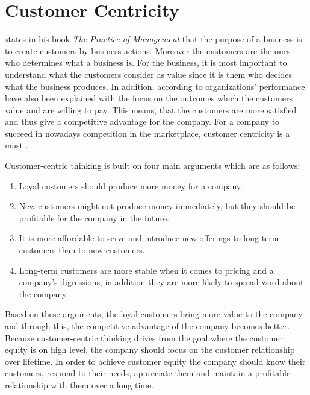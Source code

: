 \section{Customer Centricity}

\textcite{Drucker:2007} states in his book \emph{The Practice of Management} that the purpose of a business is to create customers by business actions. Moreover the customers are the ones who determines what a business is. For the business, it is most important to understand what the customers consider as value since it is them who decides what the business produces. In addition, according to \textcite{Parniangtong:2017} organizations' performance have also been explained with the focus on the outcomes which the customers value and are willing to pay. This means, that the customers are more satisfied and thus give a competitive advantage for the company. For a company to succeed in nowadays competition in the marketplace, customer centricity is a must \parencite{PathToCustomerCentricity:2006}.

Customer-centric thinking is built on four main arguments which are as follows:
\begin{enumerate}
\item Loyal customers should produce more money for a company.
\item New customers might not produce money immediately, but they should be profitable for the company in the future.
\item  It is more affordable to serve and introduce new offerings to long-term customers than to new customers.
\item  Long-term customers are more stable when it comes to pricing and a company's digressions, in addition they are more likely to spread word about the company. \parencite{Parniangtong:2017}
\end{enumerate}

Based on these arguments, the loyal customers bring more value to the company and through this, the competitive advantage of the company becomes better. Because customer-centric thinking drives from the goal where the customer equity is on high level, the company should focus on the customer relationship over lifetime. In order to achieve customer equity the company should know their customers, respond to their needs, appreciate them and maintain a profitable relationship with them over a long time. \parencite{Parniangtong:2017}

